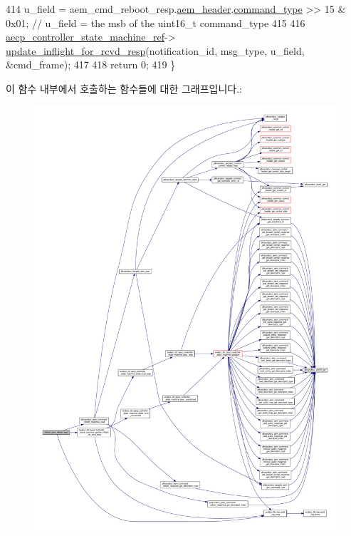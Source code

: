 \begin{DoxyCode}
414     u\_field = aem\_cmd\_reboot\_resp.\hyperlink{structjdksavdecc__aem__command__reboot__response_ae1e77ccb75ff5021ad923221eab38294}{aem\_header}.\hyperlink{structjdksavdecc__aecpdu__aem_a07f7ee802870e9ae75f021832f59a8a9}{command\_type} >> 15 & 0x01; \textcolor{comment}{// u\_field =
       the msb of the uint16\_t command\_type}
415 
416     \hyperlink{namespaceavdecc__lib_a0b1b5aea3c0490f77cbfd9178af5be22}{aecp\_controller\_state\_machine\_ref}->
      \hyperlink{classavdecc__lib_1_1aecp__controller__state__machine_a997abd9786c330a5505e903e6443208e}{update\_inflight\_for\_rcvd\_resp}(notification\_id, msg\_type, u\_field, &cmd\_frame);
417 
418     \textcolor{keywordflow}{return} 0;
419 \}
\end{DoxyCode}


이 함수 내부에서 호출하는 함수들에 대한 그래프입니다.\+:
\nopagebreak
\begin{figure}[H]
\begin{center}
\leavevmode
\includegraphics[width=350pt]{classavdecc__lib_1_1descriptor__base__imp_a774dc940e9918a60127b0b021582b32a_cgraph}
\end{center}
\end{figure}




